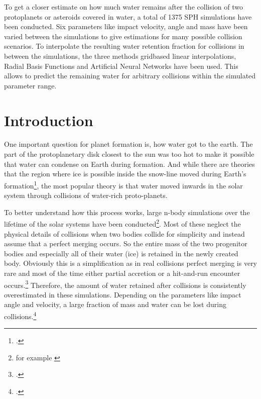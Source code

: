 

To get a closer estimate on how much water remains after the collision of two protoplanets or asteroids covered in water, a total of 1375 SPH simulations have been conducted. Six parameters like impact velocity, angle and mass have been varied between the simulations to give estimations for many possible collision scenarios. To interpolate the resulting water retention fraction for collisions in between the simulations, the three methods gridbased linear interpolations, Radial Basis Functions and Artificial Neural Networks have been used. This allows to predict the remaining water for arbitrary collisions within the simulated parameter range.

{\let\clearpage\relax \chapter{Introduction}\label{introduction}}

One important question for planet formation is, how water got to the earth. The part of the protoplanetary disk closest to the sun was too hot to make it possible that water can condense on Earth during formation. And while there are theories that the region where ice is possible inside the snow-line moved during Earth's formation\footcite{snowline}, the most popular theory is that water moved inwards in the solar system through collisions of water-rich proto-planets.



To better understand how this process works, large n-body simulations over the lifetime of the solar systems have been conducted\footnote{for example \cite{dvorakSimulation}}. Most of these neglect the physical details of collisions when two bodies collide for simplicity and instead assume that a perfect merging occurs. So the entire mass of the two progenitor bodies and especially all of their water (ice) is retained in the newly created body. Obviously this is a simplification as in real collisions perfect merging is very rare and most of the time either partial accretion or a hit-and-run encounter occurs.\footcite{CollisionTypes} Therefore, the amount of water retained after collisions is consistently overestimated in these simulations. Depending on the parameters like impact angle and velocity, a large fraction of mass and water can be lost during collisions.\footcite{MaindlSummary}

